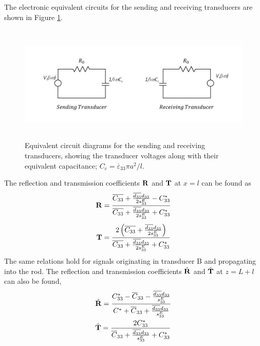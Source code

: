 \documentclass[11pt,letterpaper]{article}%
\begin{document}
The electronic equivalent circuits for the sending and receiving
transducers are shown in Figure \ref{equiv_circ}.
\begin{figure}
\begin{center}
\includegraphics[width=12.70cm,height=5.60cm]{trans_circ.jpg}
\end{center}
 \caption[des1]
   { \label{equiv_circ}
Equivalent circuit diagrams for the sending and receiving
transducers, showing the transducer voltages along with their
equivalent capacitance; $C_c = \overline{\varepsilon}_{33}\pi
a^2/l$.}
\end{figure}
The reflection and transmission coefficients ${\bf R}$ and ${\bf
T}$ at $x = l$ can be found as
\begin{equation}
{\bf R} = \frac{\overline{C_{33}}+
\frac{\overline{d_{33}}d_{33}}{2s^E_{33}} -
C^\ast_{33}}{\overline{C_{33}}+
\frac{\overline{d_{33}}d_{33}}{2s^E_{33}} + C^\ast_{33}}
\label{refcof1}
\end{equation}
\begin{equation}
{\bf T} = \frac{2\left(\overline{C_{33}}+
\frac{\overline{d_{33}}d_{33}}{2s^E_{33}}\right)}{\overline{C_{33}}+
\frac{\overline{d_{33}}d_{33}}{2s^E_{33}} + C^\ast_{33}}
\label{transcof1}
\end{equation}
The same relations hold for signals originating in transducer B
and propagating into the rod.  The reflection and transmission
coefficients $\hat{\bf R}$ and $\hat{\bf T}$ at $z=L+l$ can also
be found,
%
\begin{align}
&\hat{\bf R} = \frac{C^\ast_{33} - \overline{C}_{33} -
\frac{\overline{d_{33}}d_{33}}{s^E_{33}}}{C^\ast +
\overline{C}_{33} +
\frac{\overline{d_{33}}d_{33}}{s^E_{33}}} \nonumber\\
&\hat{\bf T} = \frac{2C^\ast_{33}}{\overline{C}_{33} +
\frac{\overline{d_{33}}d_{33}}{s^E_{33}}+ C^{\ast}_{33}}
\label{rbar2}
\end{align}
\end{document}
